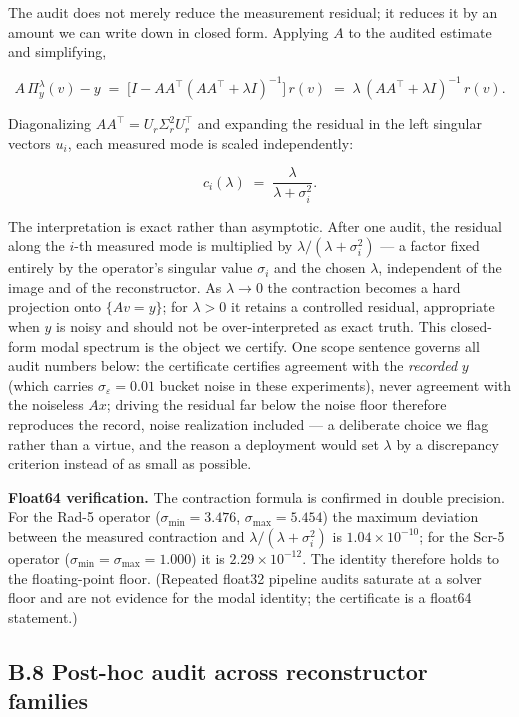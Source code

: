\documentclass[11pt]{article}
\begin{document}
The audit does not merely reduce the measurement residual; it reduces it by an amount we can write down in closed form. Applying $A$ to the audited estimate and simplifying,

$$A\,\Pi_y^\lambda(v) - y \;=\; \big[I - AA^\top(AA^\top + \lambda I)^{-1}\big]\,r(v) \;=\; \lambda\,(AA^\top + \lambda I)^{-1}\,r(v).$$

Diagonalizing $AA^\top = U_r \Sigma_r^2 U_r^\top$ and expanding the residual in the left singular vectors $u_i$, each measured mode is scaled independently:

$$c_i(\lambda) \;=\; \frac{\lambda}{\lambda + \sigma_i^2}.$$

The interpretation is exact rather than asymptotic. After one audit, the residual along the $i$-th measured mode is multiplied by $\lambda/(\lambda + \sigma_i^2)$ --- a factor fixed entirely by the operator's singular value $\sigma_i$ and the chosen $\lambda$, independent of the image and of the reconstructor. As $\lambda \to 0$ the contraction becomes a hard projection onto $\{Av = y\}$; for $\lambda > 0$ it retains a controlled residual, appropriate when $y$ is noisy and should not be over-interpreted as exact truth. This closed-form modal spectrum is the object we certify. One scope sentence governs all audit numbers below: the certificate certifies agreement with the \textit{recorded} $y$ (which carries $\sigma_\varepsilon = 0.01$ bucket noise in these experiments), never agreement with the noiseless $A x$; driving the residual far below the noise floor therefore reproduces the record, noise realization included --- a deliberate choice we flag rather than a virtue, and the reason a deployment would set $\lambda$ by a discrepancy criterion instead of as small as possible.


\textbf{Float64 verification.} The contraction formula is confirmed in double precision. For the Rad-5 operator ($\sigma_{\min} = 3.476$, $\sigma_{\max} = 5.454$) the maximum deviation between the measured contraction and $\lambda/(\lambda + \sigma_i^2)$ is $1.04\times10^{-10}$; for the Scr-5 operator ($\sigma_{\min} = \sigma_{\max} = 1.000$) it is $2.29\times10^{-12}$. The identity therefore holds to the floating-point floor. (Repeated float32 pipeline audits saturate at a solver floor and are not evidence for the modal identity; the certificate is a float64 statement.)

\subsection*{B.8 Post-hoc audit across reconstructor families}
\end{document}
